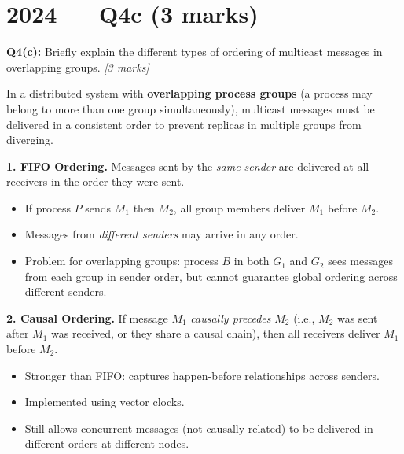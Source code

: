 \documentclass[12pt,a4paper]{article}
\begin{document}
\newpage
\section{2024 — Q4c (3 marks)}

\begin{qbox}
\textbf{Q4(c):} Briefly explain the different types of ordering of multicast messages
in overlapping groups. \hfill \textit{[3 marks]}
\end{qbox}

\begin{solbox}
In a distributed system with \textbf{overlapping process groups} (a process may belong to
more than one group simultaneously), multicast messages must be delivered in a consistent
order to prevent replicas in multiple groups from diverging.

\medskip
\textbf{1. FIFO Ordering.}
Messages sent by the \emph{same sender} are delivered at all receivers in the order
they were sent.
\begin{itemize}
  \item If process $P$ sends $M_1$ then $M_2$, all group members deliver $M_1$ before $M_2$.
  \item Messages from \emph{different senders} may arrive in any order.
  \item Problem for overlapping groups: process $B$ in both $G_1$ and $G_2$ sees
        messages from each group in sender order, but cannot guarantee global ordering
        across different senders.
\end{itemize}

\textbf{2. Causal Ordering.}
If message $M_1$ \emph{causally precedes} $M_2$ (i.e., $M_2$ was sent after $M_1$ was
received, or they share a causal chain), then all receivers deliver $M_1$ before $M_2$.
\begin{itemize}
  \item Stronger than FIFO: captures happen-before relationships across senders.
  \item Implemented using vector clocks.
  \item Still allows concurrent messages (not causally related) to be delivered in
        different orders at different nodes.
\end{itemize}


\end{solbox}
\end{document}
